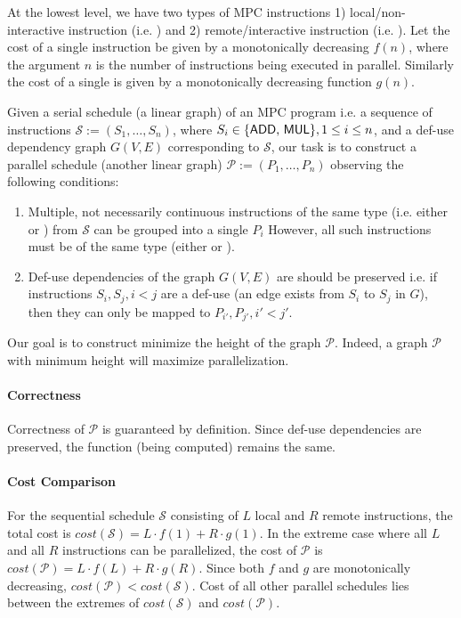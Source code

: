 \documentclass[sigconf, screen, natbib=false, dvipsnames, table]{acmart}
\theoremstyle{definition}
\begin{document}


At the lowest level, we have two types of MPC instructions 1) local/non-interactive instruction (i.e. \add) and 2) remote/interactive instruction (i.e. \mul). Let the cost of a single \add instruction be given by a monotonically decreasing $f(n)$, where the argument $n$ is the number of \add instructions being executed in parallel. Similarly the cost of a single \mul is given by a monotonically decreasing function $g(n)$.

Given a serial schedule (a linear graph) of an MPC program i.e. a sequence of instructions $\mathcal{S}:=(S_1, \dots, S_n)$, where $S_i \in \{\text{{\sf ADD}, {\sf MUL}}\}, 1 \leq i \leq n$, and a def-use dependency graph $G(V, E)$ corresponding to $\mathcal{S}$, our task is to construct a parallel schedule (another linear graph) $\mathcal{P} := (P_1, \dots, P_n)$ observing the following conditions:

\begin{enumerate}
    \item Multiple, not necessarily continuous instructions of the same type (i.e. either \add or \mul) from $\mathcal{S}$ can be grouped into a single $P_i$  However, all such instructions must be of the same type (either \add or \mul).
    \item Def-use dependencies of the graph $G(V, E)$ are should be preserved i.e. if instructions $S_i, S_j, i < j$ are a def-use (an edge exists from $S_i$ to $S_j$ in $G$), then they can only be mapped to $P_{i'}, P_{j'}, i' < j'$.
\end{enumerate}

Our goal is to construct minimize the height of the graph $\mathcal{P}$. Indeed, a graph $\mathcal{P}$ with minimum height will maximize parallelization.

\paragraph{Correctness} Correctness of $\mathcal{P}$ is guaranteed by definition. Since def-use dependencies are preserved, the function (being computed) remains the same.

\paragraph{Cost Comparison} For the sequential schedule $\mathcal{S}$ consisting of $L$ local and $R$ remote instructions, the total cost is $\mathit{cost}(\mathcal{S}) = L \cdot f(1) + R \cdot g(1)$. In the extreme case where all $L$ and all $R$ instructions can be parallelized, the cost of $\mathcal{P}$ is $\mathit{cost}(\mathcal{P}) = L \cdot f(L) + R \cdot g(R)$. Since both $f$ and $g$ are monotonically decreasing, $\mathit{cost}(\mathcal{P}) < \mathit{cost}(\mathcal{S})$. Cost of all other parallel schedules lies between the extremes of $\mathit{cost}(\mathcal{S})$ and $\mathit{cost}(\mathcal{P})$.
\end{document}
